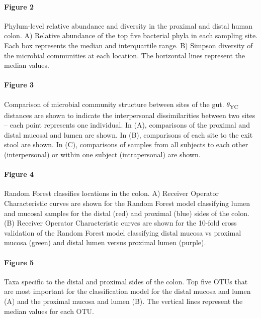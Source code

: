 \documentclass[12pt,]{article}
\let\oldparagraph\paragraph
\renewcommand{\paragraph}[1]{\oldparagraph{#1}\mbox{}}
\begin{document}
\paragraph{Figure 2}\label{figure-2}

Phylum-level relative abundance and diversity in the proximal and distal
human colon. A) Relative abundance of the top five bacterial phyla in
each sampling site. Each box represents the median and interquartile
range. B) Simpson diversity of the microbial communities at each
location. The horizontal lines represent the median values.

\paragraph{Figure 3}\label{figure-3}

Comparison of microbial community structure between sites of the gut.
\(\theta\)\textsubscript{YC} distances are shown to indicate the
interpersonal dissimilarities between two sites -- each point represents
one individual. In (A), comparisons of the proximal and distal mucosal
and lumen are shown. In (B), comparisons of each site to the exit stool
are shown. In (C), comparisons of samples from all subjects to each
other (interpersonal) or within one subject (intrapersonal) are shown.

\paragraph{Figure 4}\label{figure-4}

Random Forest classifies locations in the colon. A) Receiver Operator
Characteristic curves are shown for the Random Forest model classifying
lumen and mucosal samples for the distal (red) and proximal (blue) sides
of the colon. (B) Receiver Operator Characteristic curves are shown for
the 10-fold cross validation of the Random Forest model classifying
distal mucosa vs proximal mucosa (green) and distal lumen versus
proximal lumen (purple).

\paragraph{Figure 5}\label{figure-5}

Taxa specific to the distal and proximal sides of the colon. Top five
OTUs that are most important for the classification model for the distal
mucosa and lumen (A) and the proximal mucosa and lumen (B). The vertical
lines represent the median values for each OTU.
\end{document}

